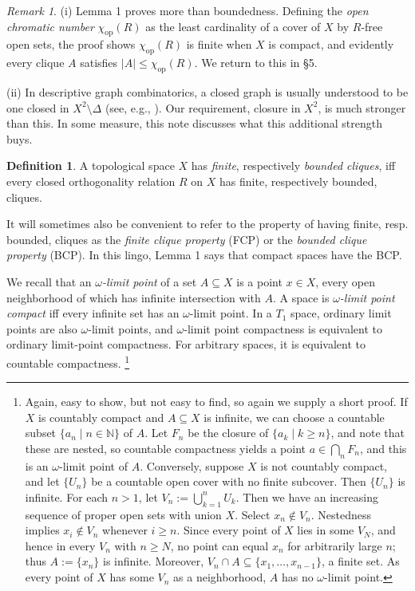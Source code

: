\documentclass[12pt]{article}
\newcommand{\N}{{\mathbb N}}
\newcommand{\chiop}{\chi_{\mathrm{op}}}
\theoremstyle{plain}
\theoremstyle{definition}
\newtheorem{definition}{Definition}
\theoremstyle{remark}
\newtheorem{remark}{Remark}
\begin{document}
\begin{remark}\label{lemmaremarks} 
(i) Lemma 1 proves more than boundedness. Defining the {\em open chromatic number} $\chiop(R)$ as the least cardinality of a cover of $X$ by $R$-free open sets, the proof shows $\chiop(R)$ is finite when $X$ is compact, and evidently every clique $A$ satisfies $|A| \le \chiop(R)$. We return to this in \S 5. 

(ii) In descriptive graph combinatorics, a 
closed graph is usually understood to be one 
closed in $X^2 \setminus \Delta$ (see, e.g., 
\cite{AZ}). Our requirement, 
closure in $X^2$, is much stronger than this. 
In some measure, this note discusses what  
this additional strength buys.
\end{remark} 


\begin{definition}  A topological space $X$ has  
{\em finite}, respectively {\em bounded cliques}, 
iff every closed orthogonality relation $R$ on $X$ has finite, respectively bounded, cliques.   \end{definition} 

It will sometimes also be convenient to refer to the property of having finite, resp. bounded, cliques as the {\em finite clique property} (FCP) or the {\em bounded clique property} (BCP). In this lingo, Lemma 1 says that compact spaces have the BCP.

We recall that an {\em $\omega$-limit point} of a set $A \subseteq X$ is a point $x \in X$,
every open neighborhood of which has infinite intersection with $A$. A space is {\em $\omega$-limit point compact} iff every infinite set has an $\omega$-limit point. In a $T_1$ space, ordinary limit points are also $\omega$-limit points, and $\omega$-limit point compactness is equivalent to ordinary 
limit-point compactness. For arbitrary spaces, 
it is equivalent to countable compactness.
\footnote{Again, easy to show, but not easy to find, 
so again we supply a short proof. If $X$ is countably compact and $A \subseteq X$ is infinite, we can choose 
a countable subset $\{a_n \mid n \in \N\}$ of $A$. 
Let $F_n$ be the closure of $\{a_k \mid k \geq n\}$, 
and note that these are nested, so countable compactness yields a point $a \in  \bigcap_{n} F_n$, and this is an $\omega$-limit point of $A$. Conversely, suppose $X$ is not countably compact, and let $\{U_n\}$ be a countable open cover with no finite subcover. Then $\{U_n\}$ is infinite. For each $n > 1$, let $V_{n} :=  \bigcup_{k =1 }^{n} U_k$. Then we have an increasing sequence of proper open sets with union $X$. Select $x_n \not \in V_n$. Nestedness implies $x_i \not\in V_n$ whenever $i \geq n$. Since every point of $X$ lies in some $V_N$, and hence in every $V_n$ with $n \geq N$, no point can equal $x_n$ for arbitrarily large $n$; thus $A := \{x_n\}$ is infinite. Moreover, $V_n \cap A \subseteq \{x_1, \ldots, x_{n-1}\}$, a finite set. As every point of $X$ has some $V_n$ as a neighborhood, $A$ has no $\omega$-limit point.}
\end{document}
